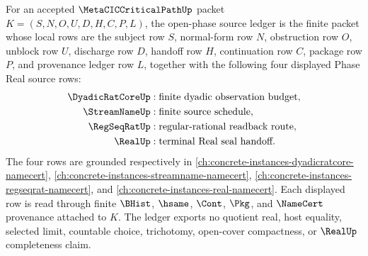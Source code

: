 \begin{definition}
\label{def:metacic-critical-path-open-phase-source-ledger}
For an accepted $\MetaCICCriticalPathUp$ packet $K=(S,N,O,U,D,H,C,P,L)$, the open-phase source ledger is the finite packet whose local rows are the subject row $S$, normal-form row $N$, obstruction row $O$, unblock row $U$, discharge row $D$, handoff row $H$, continuation row $C$, package row $P$, and provenance ledger row $L$, together with the following four displayed Phase Real source rows:
$$
\begin{aligned}
\DyadicRatCoreUp &: \text{finite dyadic observation budget},\\
\StreamNameUp &: \text{finite source schedule},\\
\RegSeqRatUp &: \text{regular-rational readback route},\\
\RealUp &: \text{terminal Real seal handoff}.
\end{aligned}
$$
The four rows are grounded respectively in \autoref{ch:concrete-instances-dyadicratcore-namecert}, \autoref{ch:concrete-instances-streamname-namecert}, \autoref{ch:concrete-instances-regseqrat-namecert}, and \autoref{ch:concrete-instances-real-namecert}. Each displayed row is read through finite $\BHist$, $\hsame$, $\Cont$, $\Pkg$, and $\NameCert$ provenance attached to $K$. The ledger exports no quotient real, host equality, selected limit, countable choice, trichotomy, open-cover compactness, or $\RealUp$ completeness claim.
\end{definition}

